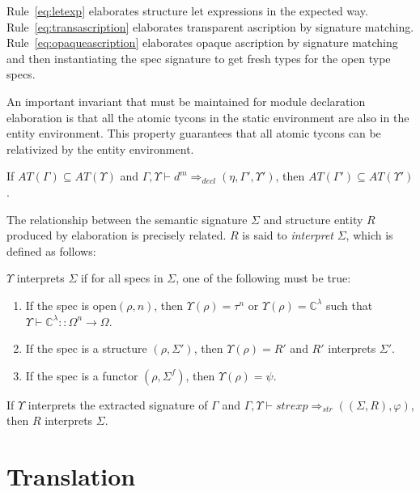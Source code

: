 \documentclass[9pt,nocopyrightspace, fleqn]{sigplanconf}
\begin{document}
Rule~\ref{eq:letexp} elaborates structure let expressions in the expected way. Rule~\ref{eq:transascription} elaborates transparent ascription by signature matching. Rule~\ref{eq:opaqueascription} elaborates opaque ascription by signature matching and then instantiating the spec signature to get fresh types for the open type specs. 


An important invariant that must be maintained for module declaration elaboration is that all the atomic tycons in the static environment are also in the entity environment. This property guarantees that all atomic tycons can be relativized by the entity environment. 

\begin{lemma}
If $AT(\Gamma) \subseteq AT(\Upsilon)$ and $\Gamma,\Upsilon\vdash d^m \Rightarrow_{decl} (\eta,\Gamma',\Upsilon')$, then $AT(\Gamma') \subseteq AT(\Upsilon')$. 
\end{lemma}

The relationship between the semantic signature $\Sigma$ and structure
entity $R$ produced by elaboration is precisely related. $R$ is said
to \emph{interpret} $\Sigma$, which is defined as follows: 

\begin{definition}
$\Upsilon$ interprets $\Sigma$ if for all specs in $\Sigma$, one of the
following must be true:
\begin{enumerate}
\item If the spec is open$(\rho,n)$, then $\Upsilon(\rho)=\tau^n$
  or $\Upsilon(\rho)=\mathbb{C}^\lambda$ such that $\Upsilon\vdash
  \mathbb{C}^\lambda :: \Omega^n \to \Omega$. 
\item If the spec is a structure $(\rho,\Sigma')$, then $\Upsilon(\rho)=R'$ and $R'$ interprets $\Sigma'$. 
\item If the spec is a functor $(\rho,\Sigma^f)$, then 
  $\Upsilon(\rho)=\psi$. 
\end{enumerate}
\end{definition}

\begin{lemma}
If $\Upsilon$ interprets the extracted signature of $\Gamma$ and 
$\Gamma,\Upsilon\vdash strexp \Rightarrow_{str} ((\Sigma, R),
\varphi)$, then $R$ interprets $\Sigma$.
\end{lemma}

\section{Translation}
\end{document}
